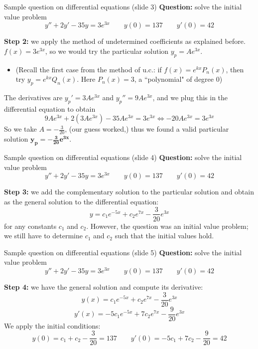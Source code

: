\begin{frame}{Sample question on differential equations (slide 3)}
    \textbf{Question:} solve the initial value problem \[y''+2y'-35y=3e^{3x}\qquad y(0)=137\qquad y'(0)=42\]
    
    \textbf{Step 2:} we apply the method of undetermined coefficients as explained before. $f(x)=3e^{3x}$, so we would try the particular solution $y_p=Ae^{3x}$.
    \begin{itemize}
    \item{\scriptsize(Recall the first case from the method of u.c.: if $f(x)=e^{kx}P_n(x)$, then try $y_p=e^{kx}Q_n(x)$. Here $P_n(x)=3$, a ``polynomial" of degree 0)}
    \end{itemize}
    The derivatives are $y_p'=3Ae^{3x}$ and $y_p''=9Ae^{3x}$, and we plug this in the differential equation to obtain
    \[9Ae^{3x}+2(3Ae^{3x})-35Ae^{3x}=3e^{3x}\iff-20Ae^{3x}=3e^{3x}\]
    So we take $A=-\frac{3}{20}$, (our guess worked,) thus we found a valid particular solution $\pmb{y_p=-\frac{3}{20}e^{3x}}$.

\end{frame}

\begin{frame}{Sample question on differential equations (slide 4)}
    \textbf{Question:} solve the initial value problem \[y''+2y'-35y=3e^{3x}\qquad y(0)=137\qquad y'(0)=42\]
    
    \textbf{Step 3:} we add the complementary solution to the particular solution and obtain as the general solution to the differential equation: \[y=c_1e^{-5x} + c_2e^{7x}-\frac{3}{20}e^{3x}\] for any constants $c_1$ and $c_2$. However, the question was an initial value problem; we still have to determine $c_1$ and $c_2$ such that the initial values hold.

\end{frame}

\begin{frame}{Sample question on differential equations (slide 5)}
    \textbf{Question:} solve the initial value problem \[y''+2y'-35y=3e^{3x}\qquad y(0)=137\qquad y'(0)=42\]
    
    \textbf{Step 4:} we have the general solution and compute its derivative: \[y(x)=c_1e^{-5x} + c_2e^{7x}-\frac{3}{20}e^{3x}\]  \vspace{-5mm}\[y'(x)=-5c_1e^{-5x}+7c_2e^{7x}-\frac{9}{20}e^{3x}\]
    We apply the initial conditions: \[y(0)=c_1+c_2-\frac{3}{20}=137\quad\quad y'(0)=-5c_1+7c_2-\frac{9}{20}=42\]
    

\end{frame}
\fi